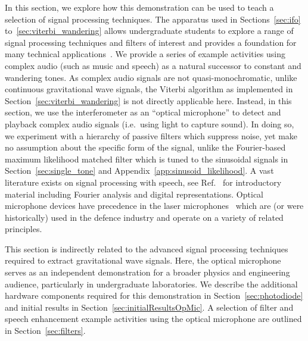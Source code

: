 \documentclass[paper-main.tex]{subfiles}
\begin{document}
In this section, we explore how this demonstration can be used to teach a selection of signal processing techniques.
The apparatus used in Sections~\ref{sec:ifo} to~\ref{sec:viterbi_wandering} allows undergraduate students to explore a range of signal processing techniques and filters of interest and provides a foundation for many technical applications~\cite{DigitalProcingOfSpeechSignals:1978}. 
We provide a series of example activities using complex audio (such as music and speech) as a natural successor to constant and wandering tones. 
As complex audio signals are not quasi-monochromatic, unlike continuous gravitational wave signals, the Viterbi algorithm as implemented in Section~\ref{sec:viterbi_wandering} is not directly applicable here. Instead, in this section, we use the interferometer as an ``optical microphone'' to detect and playback complex audio signals (i.e.\ using light to capture sound).
In doing so, we experiment with a hierarchy of passive filters which suppress noise, yet make no assumption about the specific form of the signal, unlike the Fourier-based maximum likelihood matched filter which is tuned to the sinusoidal signals in Section~\ref{sec:single_tone} and Appendix~\ref{app:sinusoid_likelihood}.
A vast literature exists on signal processing with speech, see Ref.~\cite{DigitalProcingOfSpeechSignals:1978} for introductory material including Fourier analysis and digital representations.
Optical microphone devices have precedence in the laser microphones~\cite{laser_microphone} which are (or were historically) used in the defence industry and operate on a variety of related principles.
  


This section is indirectly related to the advanced signal processing techniques required to extract gravitational wave signals.
Here, the optical microphone serves as an independent demonstration for a broader physics and engineering audience, particularly in undergraduate laboratories.
We describe the additional hardware components required for this demonstration in Section~\ref{sec:photodiode} and initial results in Section~\ref{sec:initialResultsOpMic}. 
A selection of filter and speech enhancement example activities using the optical microphone are outlined in Section~\ref{sec:filters}.
\end{document}
